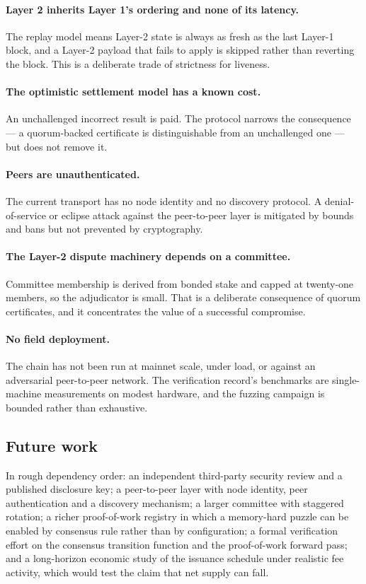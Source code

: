 \documentclass{article}
\begin{document}
\paragraph{Layer 2 inherits Layer 1's ordering and none of its latency.} The
replay model means Layer-2 state is always as fresh as the last Layer-1 block,
and a Layer-2 payload that fails to apply is skipped rather than reverting the
block. This is a deliberate trade of strictness for liveness.

\paragraph{The optimistic settlement model has a known cost.} An unchallenged
incorrect result is paid. The protocol narrows the consequence --- a
quorum-backed certificate is distinguishable from an unchallenged one --- but
does not remove it.

\paragraph{Peers are unauthenticated.} The current transport has no node
identity and no discovery protocol. A denial-of-service or eclipse attack
against the peer-to-peer layer is mitigated by bounds and bans but not
prevented by cryptography.

\paragraph{The Layer-2 dispute machinery depends on a committee.} Committee
membership is derived from bonded stake and capped at twenty-one members, so
the adjudicator is small. That is a deliberate consequence of quorum
certificates, and it concentrates the value of a successful compromise.

\paragraph{No field deployment.} The chain has not been run at mainnet scale,
under load, or against an adversarial peer-to-peer network. The verification
record's benchmarks are single-machine measurements on modest hardware, and the
fuzzing campaign is bounded rather than exhaustive.

\subsection{Future work}

In rough dependency order: an independent third-party security review and a
published disclosure key; a peer-to-peer layer with node identity, peer
authentication and a discovery mechanism; a larger committee with staggered
rotation; a richer proof-of-work registry in which a memory-hard puzzle can be
enabled by consensus rule rather than by configuration; a formal verification
effort on the consensus transition function and the proof-of-work forward
pass; and a long-horizon economic study of the issuance schedule under
realistic fee activity, which would test the claim that net supply can fall.
\end{document}
